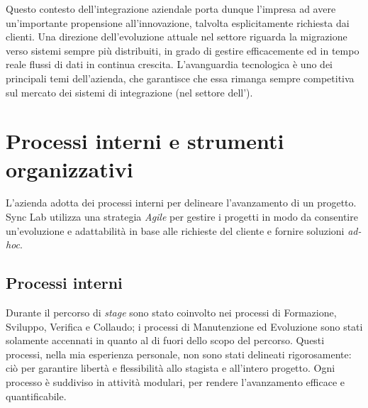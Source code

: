 Questo contesto dell'integrazione aziendale porta dunque l'impresa ad avere un'importante propensione all'innovazione, talvolta esplicitamente richiesta dai clienti.
Una direzione dell'evoluzione attuale nel settore  riguarda la migrazione verso sistemi sempre più distribuiti, in grado di gestire efficacemente ed in tempo reale flussi di dati in continua crescita.
L'avanguardia tecnologica è uno dei principali temi dell'azienda, che garantisce che essa rimanga sempre competitiva sul mercato dei sistemi di integrazione (nel settore dell').



\section{Processi interni e strumenti organizzativi}

%


L'azienda adotta dei processi interni per delineare l'avanzamento di un progetto.
Sync Lab utilizza una strategia \textit{Agile} per gestire i progetti in modo da consentire un'evoluzione e adattabilità in base alle richieste del cliente e fornire soluzioni \textit{ad-hoc}.

\subsection{Processi interni}

Durante il percorso di \textit{stage} sono stato coinvolto nei processi di Formazione, Sviluppo, Verifica e Collaudo; i processi di Manutenzione ed Evoluzione sono stati solamente accennati in quanto al di fuori dello scopo del percorso.
Questi processi, nella mia esperienza personale, non sono stati delineati rigorosamente: ciò per garantire libertà e flessibilità allo stagista e all'intero progetto.
Ogni processo è suddiviso in attività modulari, per rendere l'avanzamento efficace e quantificabile.

